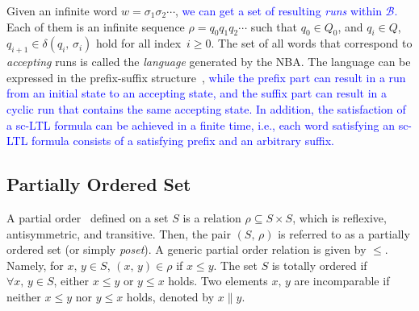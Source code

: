 Given an infinite word $w=\sigma_1\sigma_2\cdots$, \textcolor{blue}{we can get a set of resulting \emph{runs} within $\mathcal{B}$.}
Each of them is an infinite sequence $\rho=q_0q_1q_2\cdots$
such that $q_0\in Q_0$, and $q_i\in Q$, $q_{i+1}\in\delta(q_i,\,\sigma_i)$ hold for all index~$i\geq 0$.
The set of all words that correspond to \emph{accepting} runs is called
the \emph{language} generated by the NBA. The language can be expressed
in the prefix-suffix structure~\textcolor{blue}{\citep{baier2008principles}},
\textcolor{blue}{while the prefix part
can result in a run from an initial state to an accepting state, and the suffix
part can result in a cyclic run that contains the same accepting state.}
\textcolor{blue}{In addition, the
satisfaction of a \textcolor{blue}{sc-LTL} formula can be achieved in a finite time, i.e.,
each word satisfying an \textcolor{blue}{sc-LTL} formula consists of a satisfying prefix
and an arbitrary suffix.}

\subsection{Partially Ordered Set}\label{subsec:partial}
A partial order~\citep{simovici2008mathematical} defined on a set $S$ is a relation $\rho\subseteq S\times S$,
which is reflexive, antisymmetric, and transitive.
Then, the pair $(S,\, \rho)$ is referred to as a partially ordered set (or simply \emph{poset}).
A generic partial order relation is given by $\leq$.
Namely, for $x,\,y\in S$, $(x,\,y)\in \rho$ if $x\leq y$.
The set $S$ is totally ordered if $\forall x,\,y\in S$, either $x\leq y$ or $y\leq x$ holds.
Two elements $x,\,y$ are incomparable if neither $x\leq y$ nor $y\leq x$ holds, denoted by $x\parallel y$.
